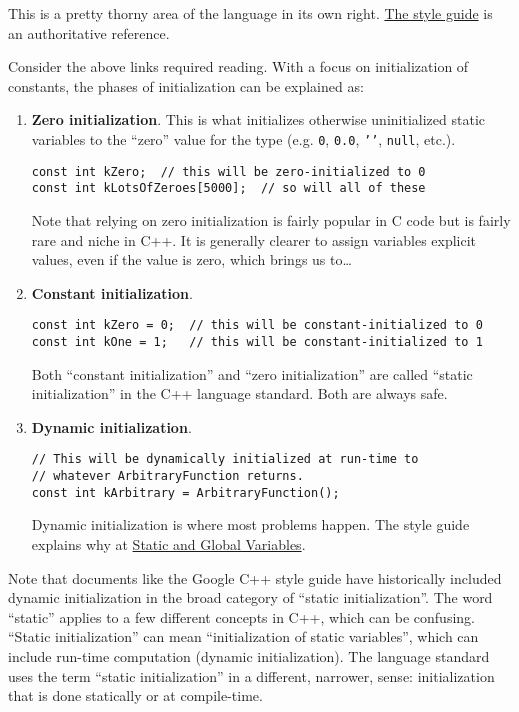 This is a pretty thorny area of the language in its own right. \hyperref[sec:static-and-global-variables]{The style guide} is an authoritative reference.

Consider the above links required reading. With a focus on initialization of constants, the phases of initialization can be explained as:
\begin{enumerate}
    \item \textbf{Zero initialization}. This is what initializes otherwise uninitialized static variables to the \enquote{zero} value for the type (e.g. \texttt{0}, \texttt{0.0}, \texttt{'\0'}, \texttt{null}, etc.).
    \begin{verbatim}
const int kZero;  // this will be zero-initialized to 0
const int kLotsOfZeroes[5000];  // so will all of these
    \end{verbatim}
    Note that relying on zero initialization is fairly popular in C code but is fairly rare and niche in C++. It is generally clearer to assign variables explicit values, even if the value is zero, which brings us to…
    \item \textbf{Constant initialization}.
    \begin{verbatim}
const int kZero = 0;  // this will be constant-initialized to 0
const int kOne = 1;   // this will be constant-initialized to 1
    \end{verbatim}
    Both \enquote{constant initialization} and \enquote{zero initialization} are called \enquote{static initialization} in the C++ language standard. Both are always safe.
    \item \textbf{Dynamic initialization}.
    \begin{verbatim}
// This will be dynamically initialized at run-time to
// whatever ArbitraryFunction returns.
const int kArbitrary = ArbitraryFunction();
    \end{verbatim}
    Dynamic initialization is where most problems happen. The style guide explains why at \hyperref[sec:static-and-global-variables]{Static and Global Variables}.
\end{enumerate}
Note that documents like the Google C++ style guide have historically included dynamic initialization in the broad category of \enquote{static initialization}. The word \enquote{static} applies to a few different concepts in C++, which can be confusing. \enquote{Static initialization} can mean \enquote{initialization of static variables}, which can include run-time computation (dynamic initialization). The language standard uses the term \enquote{static initialization} in a different, narrower, sense: initialization that is done statically or at compile-time.


